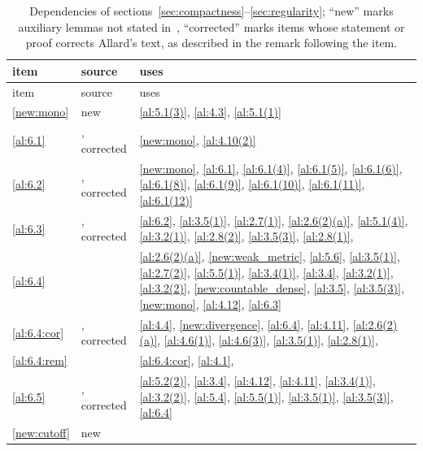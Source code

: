 \begin{center}
\small
\begin{longtable}{p{}p{}p{}}
    \caption{Dependencies of sections~\ref{sec:compactness}--\ref{sec:regularity}; ``new'' marks
    auxiliary lemmas not stated in~\cite{Allard1972}, ``corrected'' marks items whose statement
    or proof corrects Allard's text, as described in the remark following the item.}
    \label{tab:dependencies6to8} \\
    item & source & uses \\
    \hline
    \endfirsthead
    item & source & uses \\
    \hline
    \endhead
\ref{new:mono} & new & \ref{al:5.1(3)}, \ref{al:4.3}, \ref{al:5.1(1)} \\
\ref{al:6.1} & \cite[6.1]{Allard1972}, corrected & \ref{new:mono}, \ref{al:4.10(2)} \\
\ref{al:6.2} & \cite[6.2]{Allard1972}, corrected & \ref{new:mono}, \ref{al:6.1}, \ref{al:6.1(4)}, \ref{al:6.1(5)}, \ref{al:6.1(6)}, \ref{al:6.1(8)}, \ref{al:6.1(9)}, \ref{al:6.1(10)}, \ref{al:6.1(11)}, \ref{al:6.1(12)} \\
\ref{al:6.3} & \cite[6.3]{Allard1972}, corrected & \ref{al:6.2}, \ref{al:3.5(1)}, \ref{al:2.7(1)}, \ref{al:2.6(2)(a)}, \ref{al:5.1(4)}, \ref{al:3.2(1)}, \ref{al:2.8(2)}, \ref{al:3.5(3)}, \ref{al:2.8(1)}, \cite[2.10.11]{Federer1969} \\
\ref{al:6.4} & \cite[6.4]{Allard1972} & \ref{al:2.6(2)(a)}, \ref{new:weak_metric}, \ref{al:5.6}, \ref{al:3.5(1)}, \ref{al:2.7(2)}, \ref{al:5.5(1)}, \ref{al:3.4(1)}, \ref{al:3.4}, \ref{al:3.2(1)}, \ref{al:3.2(2)}, \ref{new:countable_dense}, \ref{al:3.5}, \ref{al:3.5(3)}, \ref{new:mono}, \ref{al:4.12}, \ref{al:6.3} \\
\ref{al:6.4:cor} & \cite[6.4, Corollary]{Allard1972}, corrected & \ref{al:4.4}, \ref{new:divergence}, \ref{al:6.4}, \ref{al:4.11}, \ref{al:2.6(2)(a)}, \ref{al:4.6(1)}, \ref{al:4.6(3)}, \ref{al:3.5(1)}, \ref{al:2.8(1)}, \cite[2.4.14, 3.1.13]{Federer1969} \\
\ref{al:6.4:rem} & \cite[6.4, Remark]{Allard1972} & \ref{al:6.4:cor}, \ref{al:4.1}, \cite[2.4.9, 2.6.2, 2.9.20, 3.2.3, 3.2.5]{Federer1969} \\
\ref{al:6.5} & \cite[6.5]{Allard1972}, corrected & \ref{al:5.2(2)}, \ref{al:3.4}, \ref{al:4.12}, \ref{al:4.11}, \ref{al:3.4(1)}, \ref{al:3.2(2)}, \ref{al:5.4}, \ref{al:5.5(1)}, \ref{al:3.5(1)}, \ref{al:3.5(3)}, \ref{al:6.4} \\
\ref{new:cutoff} & new & \cite[4.1.2]{Federer1969} \\

\end{longtable}
\end{center}
